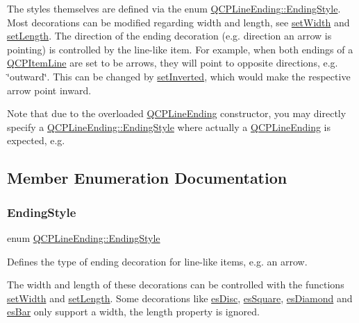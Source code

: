 The styles themselves are defined via the enum \hyperlink{class_q_c_p_line_ending_a5ef16e6876b4b74959c7261d8d4c2cd5}{Q\+C\+P\+Line\+Ending\+::\+Ending\+Style}. Most decorations can be modified regarding width and length, see \hyperlink{class_q_c_p_line_ending_a26dc020ea985a72cc25881ce2115e34e}{set\+Width} and \hyperlink{class_q_c_p_line_ending_ae36fa01763751cd64b7f56c3507e935a}{set\+Length}. The direction of the ending decoration (e.\+g. direction an arrow is pointing) is controlled by the line-\/like item. For example, when both endings of a \hyperlink{class_q_c_p_item_line}{Q\+C\+P\+Item\+Line} are set to be arrows, they will point to opposite directions, e.\+g. \char`\"{}outward\char`\"{}. This can be changed by \hyperlink{class_q_c_p_line_ending_a580e4e2360b35ebb8d68f3494aa2335d}{set\+Inverted}, which would make the respective arrow point inward.

Note that due to the overloaded \hyperlink{class_q_c_p_line_ending}{Q\+C\+P\+Line\+Ending} constructor, you may directly specify a \hyperlink{class_q_c_p_line_ending_a5ef16e6876b4b74959c7261d8d4c2cd5}{Q\+C\+P\+Line\+Ending\+::\+Ending\+Style} where actually a \hyperlink{class_q_c_p_line_ending}{Q\+C\+P\+Line\+Ending} is expected, e.\+g. 
\begin{DoxyCodeInclude}
\end{DoxyCodeInclude}


\subsection{Member Enumeration Documentation}
\mbox{\label{class_q_c_p_line_ending_a5ef16e6876b4b74959c7261d8d4c2cd5}} 
\subsubsection{\texorpdfstring{Ending\+Style}{EndingStyle}}
{\footnotesize\ttfamily enum \hyperlink{class_q_c_p_line_ending_a5ef16e6876b4b74959c7261d8d4c2cd5}{Q\+C\+P\+Line\+Ending\+::\+Ending\+Style}}

Defines the type of ending decoration for line-\/like items, e.\+g. an arrow.



The width and length of these decorations can be controlled with the functions \hyperlink{class_q_c_p_line_ending_a26dc020ea985a72cc25881ce2115e34e}{set\+Width} and \hyperlink{class_q_c_p_line_ending_ae36fa01763751cd64b7f56c3507e935a}{set\+Length}. Some decorations like \hyperlink{class_q_c_p_line_ending_a5ef16e6876b4b74959c7261d8d4c2cd5ae5a3414916817258bcc6dddd605e8f5c}{es\+Disc}, \hyperlink{class_q_c_p_line_ending_a5ef16e6876b4b74959c7261d8d4c2cd5ae1836502fa43d8990bb62b2d493a140a}{es\+Square}, \hyperlink{class_q_c_p_line_ending_a5ef16e6876b4b74959c7261d8d4c2cd5a378fe5a8b768411b0bc1765210fe7200}{es\+Diamond} and \hyperlink{class_q_c_p_line_ending_a5ef16e6876b4b74959c7261d8d4c2cd5a2cf543bbca332df26d89bf779f50469f}{es\+Bar} only support a width, the length property is ignored.


